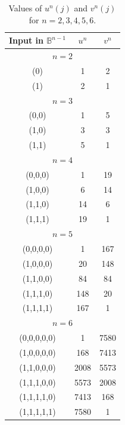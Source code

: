 \documentclass[11pt,a4paper]{article}
\newcommand{\bbB}{\mathbb{B}}
\theoremstyle{definition}
\theoremstyle{remark}
\begin{document}
\begin{enumerate}
\begin{table}[h]
    \centering
    \caption{Values of $u^n(j)$ and $v^n(j)$ for $n=2,3,4,5,6.$}
    \begin{tabular}{|c|c|c|}
        \hline
        \textbf{Input in} $\bbB^{n-1}$ & $u^n$ & $v^n$ \\
        \hline
        \multicolumn{3}{|c|}{\textbf{ \( n = 2 \)}} \\
        \hline
        (0) & 1  & 2  \\
        (1) & 2  & 1  \\
        \hline
        \multicolumn{3}{|c|}{\textbf{ \( n = 3 \)}} \\
        \hline
        (0,0) & 1  & 5  \\
        (1,0) & 3  & 3  \\
        (1,1) & 5  & 1  \\
        \hline
        \multicolumn{3}{|c|}{\textbf{\( n = 4 \)}} \\
        \hline
        (0,0,0) & 1  & 19  \\
        (1,0,0) & 6  & 14  \\
        (1,1,0) & 14  & 6  \\
        (1,1,1) & 19  & 1  \\
        \hline
        \multicolumn{3}{|c|}{\textbf{ \( n = 5 \)}} \\
        \hline
        (0,0,0,0) & 1   & 167  \\
        (1,0,0,0) & 20  & 148  \\
        (1,1,0,0) & 84  & 84   \\
        (1,1,1,0) & 148 & 20   \\
        (1,1,1,1) & 167 & 1    \\
        \hline
        \multicolumn{3}{|c|}{\textbf{ \( n = 6 \)}} \\
        \hline
        (0,0,0,0,0) & 1    & 7580 \\
        (1,0,0,0,0) & 168  & 7413 \\
        (1,1,0,0,0) & 2008 & 5573 \\
        (1,1,1,0,0) & 5573 & 2008 \\
        (1,1,1,1,0) & 7413 & 168  \\
        (1,1,1,1,1) & 7580 & 1    \\
        \hline
    \end{tabular}
    \label{table}
\end{table}
\end{enumerate}
\end{document}
